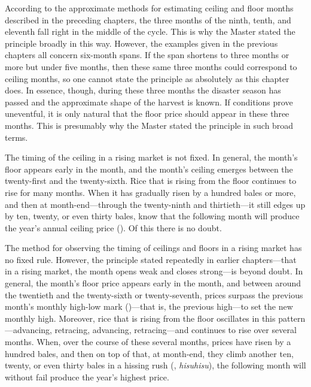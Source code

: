 \commentary
According to the approximate methods for estimating ceiling and
floor months described in the preceding chapters, the three months
of the ninth, tenth, and eleventh fall right in the middle of the
cycle. This is why the Master stated the principle broadly in this
way. However, the examples given in the previous chapters all
concern six-month spans. If the span shortens to three months or
more but under five months, then these same three months could
correspond to ceiling months, so one cannot state the principle as
absolutely as this chapter does. In essence, though, during these
three months the disaster season has passed and the approximate
shape of the harvest is known. If conditions prove uneventful, it
is only natural that the floor price should appear in these three
months. This is presumably why the Master stated the principle in
such broad terms.


\begin{sokyubox}
{\small\itshape\color{sokyubar} }

\medskip
The timing of the ceiling in a rising market is not fixed. In
general, the month's floor appears early in the month, and
the month's ceiling emerges between the twenty-first and the
twenty-sixth. Rice that is rising from the floor continues to
rise for many months. When it has gradually risen by a hundred
bales or more, and then at month-end---through the twenty-ninth
and thirtieth---it still edges up by ten, twenty, or even thirty
bales, know that the following month will produce the year's
annual ceiling price (). Of this there is no doubt.
\end{sokyubox}

\commentary
The method for observing the timing of ceilings and floors in a
rising market has no fixed rule. However, the principle stated
repeatedly in earlier chapters---that in a rising market, the
month opens weak and closes strong---is beyond doubt. In general,
the month's floor price appears early in the month, and between
around the twentieth and the twenty-sixth or twenty-seventh, prices
surpass the previous month's monthly high-low mark ()---that is, the previous high---to set the new
monthly high. Moreover, rice that is rising from the floor
oscillates in this pattern---advancing, retracing, advancing,
retracing---and continues to rise over several months. When,
over the course of these several months, prices have risen by a
hundred bales, and then on top of that, at month-end, they climb
another ten, twenty, or even thirty bales in a hissing rush
(, \textit{hisuhisu}), the following month will without fail
produce the year's highest price.

